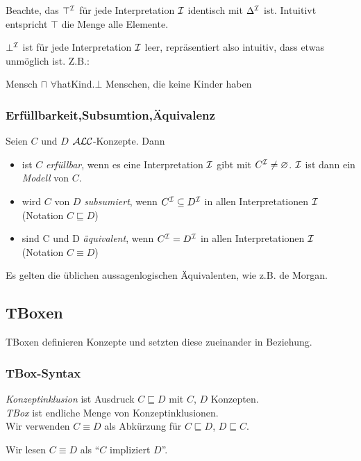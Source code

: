 Beachte, das $\top^{\mathcal{I}}$ für jede Interpretation $\mathcal{I}$ identisch mit $\Delta^{\mathcal{I}}$ ist. Intuitivt entspricht $\top$ die Menge alle Elemente. 

$\bot^{\mathcal{I}}$ ist für jede Interpretation $\mathcal{I}$ leer, repräsentiert also intuitiv, dass etwas unmöglich ist. Z.B.:

Mensch $\sqcap$ $\forall$hatKind.$\bot$
Menschen, die keine Kinder haben

{\subsubsection{Erfüllbarkeit,Subsumtion,Äquivalenz}\label{erfuxfcllbarkeit-subsumtion-uxe4quivalenz}}

\begin{definition}
Seien $C$ und $D$ $\mathcal{A}\mathcal{L}\mathcal{C}$-Konzepte. Dann

\begin{itemize}
\item
  ist $C$ \emph{erfüllbar}, wenn es eine Interpretation $\mathcal{I}$ gibt mit
  $C^{\mathcal{I}} \neq \varnothing$. $\mathcal{I}$ ist dann ein \emph{Modell} von
  $C$.
\item
  wird $C$ von $D$ \emph{subsumiert}, wenn $C^{\mathcal{I}} \subseteq D^{\mathcal{I}}$
  in allen Interpretationen $\mathcal{I}$ (Notation $C \sqsubseteq D$)
\item
  sind C und D \emph{äquivalent}, wenn $C^{\mathcal{I}} = D^{\mathcal{I}}$ in allen
  Interpretationen $\mathcal{I}$ (Notation $C \equiv D$)
\end{itemize}
\end{definition}

Es gelten die üblichen aussagenlogischen Äquivalenten, wie z.B. de
Morgan.

\subsection{TBoxen}\label{tboxen}

TBoxen definieren Konzepte und setzten diese zueinander in Beziehung.

\subsubsection{TBox-Syntax}\label{tboxsyntax}

\begin{definition}
\emph{Konzeptinklusion} ist Ausdruck $C \sqsubseteq D$ mit $C$, $D$ Konzepten. \\
\emph{TBox} ist endliche Menge von Konzeptinklusionen. \\
Wir verwenden $C \equiv D$ als Abkürzung für $C \sqsubseteq D$, $D \sqsubseteq C$. 

Wir lesen $C \equiv D$ als \enquote{$C$ impliziert $D$}.
\end{definition}

